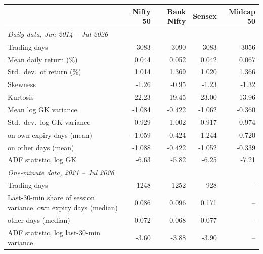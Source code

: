 \begin{tabular}{lrrrr}
\toprule
 & Nifty 50 & Bank Nifty & Sensex & Midcap 50 \\
\midrule
\multicolumn{5}{l}{\emph{Daily data, Jan 2014 -- Jul 2026}} \\
Trading days & 3083 & 3090 & 3083 & 3056 \\
Mean daily return (\%) & 0.044 & 0.052 & 0.042 & 0.067 \\
Std.\ dev.\ of return (\%) & 1.014 & 1.369 & 1.020 & 1.366 \\
Skewness & -1.26 & -0.95 & -1.23 & -1.32 \\
Kurtosis & 22.23 & 19.45 & 23.00 & 13.96 \\
Mean log GK variance & -1.084 & -0.422 & -1.062 & -0.360 \\
Std.\ dev.\ log GK variance & 0.929 & 1.002 & 0.917 & 0.974 \\
\quad on own expiry days (mean) & -1.059 & -0.424 & -1.244 & -0.720 \\
\quad on other days (mean) & -1.088 & -0.422 & -1.052 & -0.339 \\
ADF statistic, log GK & -6.63 & -5.82 & -6.25 & -7.21 \\
\midrule
\multicolumn{5}{l}{\emph{One-minute data, 2021 -- Jul 2026}} \\
Trading days & 1248 & 1252 & 928 & -- \\
Last-30-min share of session variance, own expiry days (median) & 0.086 & 0.096 & 0.171 & -- \\
\quad other days (median) & 0.072 & 0.068 & 0.077 & -- \\
ADF statistic, log last-30-min variance & -3.60 & -3.88 & -3.90 & -- \\
\bottomrule
\end{tabular}